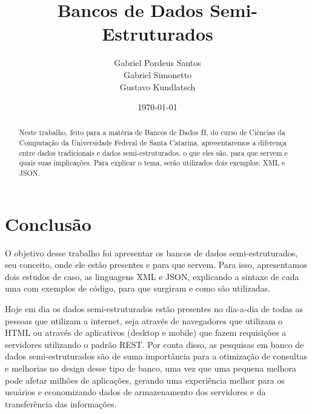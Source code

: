 \documentclass{article}
\title{Bancos de Dados Semi-Estruturados}
\author{
Gabriel Pordeus Santos \\ %
Gabriel Simonetto \\
Gustavo Kundlatsch
}
\date{\today}
\begin{document}
\maketitle

\begin{abstract}
    Neste trabalho, feito para a matéria de Bancos de Dados II, do curso de Ciências da Computação da Universidade Federal de Santa Catarina, apresentaremos a diferença entre dados tradicionais e dados semi-estruturados, o que eles são, para que servem e quais suas implicações. Para explicar o tema, serão utilizados dois exemplos: XML e JSON.
\end{abstract}





\section{Conclusão}

O objetivo desse trabalho foi apresentar os bancos de dados semi-estruturados, seu conceito, onde ele estão presentes e para que servem. Para isso, apresentamos dois estudos de caso, as linguagens XML e JSON, explicando a sintaxe de cada uma com exemplos de código, para que surgiram e como são utilizadas.

Hoje em dia os dados semi-estruturados estão presentes no dia-a-dia de todas as pessoas que utilizam a internet, seja através de navegadores que utilizam o HTML ou através de aplicativos (desktop e mobile) que fazem requisições a servidores utilizando o padrão REST. Por conta disso, as pesquisas em banco de dados semi-estruturados são de suma importância para a otimização de consultas e melhorias no design desse tipo de banco, uma vez que uma pequena melhora pode afetar milhões de aplicações, gerando uma experiência melhor para os usuários e economizando dados de armazenamento dos servidores e da transferência das informações. 

\newpage



\end{document}
